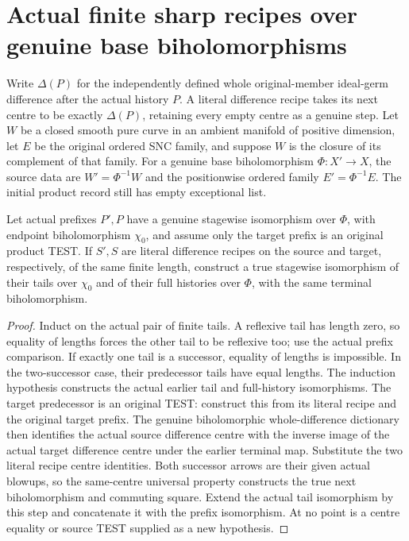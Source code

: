 \section{Actual finite sharp recipes over genuine base biholomorphisms}

Write $\Delta(P)$ for the independently defined whole original-member
ideal-germ difference after the actual history $P$. A literal difference
recipe takes its next centre to be exactly $\Delta(P)$, retaining every
empty centre as a genuine step. Let $W$ be a closed smooth pure curve in
an ambient manifold of positive dimension, let $E$ be the original ordered
SNC family, and suppose $W$ is the closure of its complement of that family.
For a genuine base biholomorphism $\Phi:X'\to X$, the source data are
$W'=\Phi^{-1}W$ and the positionwise ordered family $E'=\Phi^{-1}E$.
The initial product record still has empty exceptional list.

\begin{theorem}
\label{hir:sharp-actual-curve-biholo-finite-difference-recipes}
\leanok
Let actual prefixes $P',P$ have a genuine stagewise isomorphism over $\Phi$,
with endpoint biholomorphism $\chi_0$, and assume only the target prefix is
an original product TEST. If $S',S$ are literal difference recipes on the
source and target, respectively, of the same finite length, construct a
true stagewise isomorphism of their tails over $\chi_0$ and of their full
histories over $\Phi$, with the same terminal biholomorphism.
\end{theorem}
\begin{proof}
Induct on the actual pair of finite tails. A reflexive tail has length zero,
so equality of lengths forces the other tail to be reflexive too; use the
actual prefix comparison. If exactly one tail is a successor, equality of
lengths is impossible. In the two-successor case, their predecessor tails
have equal lengths. The induction hypothesis constructs the actual earlier
tail and full-history isomorphisms. The target predecessor is an original
TEST: construct this from its literal recipe and the original target prefix.
The genuine biholomorphic whole-difference dictionary then identifies the
actual source difference centre with the inverse image of the actual target
difference centre under the earlier terminal map. Substitute the two literal
recipe centre identities. Both successor arrows are their given actual
blowups, so the same-centre universal property constructs the true next
biholomorphism and commuting square. Extend the actual tail isomorphism by
this step and concatenate it with the prefix isomorphism. At no point is a
centre equality or source TEST supplied as a new hypothesis.
\end{proof}

